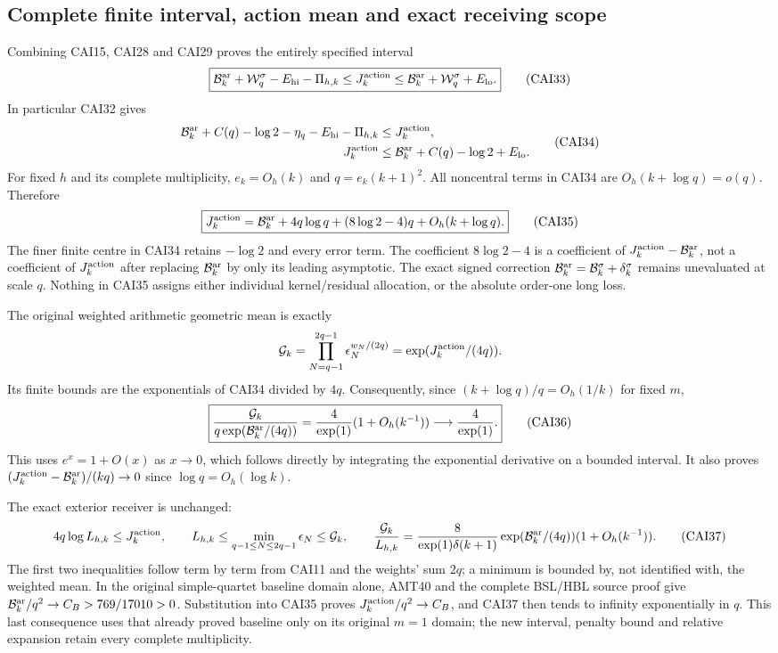 \subsection{Complete finite interval, action mean and exact receiving scope}

Combining CAI15, CAI28 and CAI29 proves the entirely specified interval
\[
 \boxed{\mathcal B_k^{\rm ar}+\mathcal W_q^\sigma-E_{\rm hi}-\Pi_{h,k}
       \le J_k^{\rm action}
       \le\mathcal B_k^{\rm ar}+\mathcal W_q^\sigma+E_{\rm lo}.}
 \tag{CAI33}
\]
In particular CAI32 gives
\[
\begin{aligned}
 \mathcal B_k^{\rm ar}+C(q)-\log2-\eta_q-E_{\rm hi}-\Pi_{h,k}
     &\le J_k^{\rm action},\\
 J_k^{\rm action}&\le\mathcal B_k^{\rm ar}+C(q)-\log2+E_{\rm lo}.
\end{aligned}\tag{CAI34}
\]
For fixed $h$ and its complete multiplicity, $e_k=O_h(k)$ and
$q=e_k(k+1)^2$. All noncentral terms in CAI34 are
$O_h(k+\log q)=o(q)$. Therefore
\[
 \boxed{J_k^{\rm action}=\mathcal B_k^{\rm ar}
     +4q\log q+(8\log2-4)q+O_h(k+\log q).}\tag{CAI35}
\]
The finer finite centre in CAI34 retains $-\log2$ and every error term.
The coefficient $8\log2-4$ is a coefficient of
$J_k^{\rm action}-\mathcal B_k^{\rm ar}$, not a coefficient of
$J_k^{\rm action}$ after replacing $\mathcal B_k^{\rm ar}$ by only its
leading asymptotic. The exact signed correction
$\mathcal B_k^{\rm ar}=\mathcal B_k^\sigma+\delta_k^\sigma$ remains
unevaluated at scale $q$. Nothing in CAI35 assigns either individual
kernel/residual allocation, or the absolute order-one long loss.

The original weighted arithmetic geometric mean is exactly
\[
 \mathcal G_k=\prod_{N=q-1}^{2q-1}\epsilon_N^{w_N/(2q)}
             =\exp(J_k^{\rm action}/(4q)).
\]
Its finite bounds are the exponentials of CAI34 divided by $4q$.
Consequently, since $(k+\log q)/q=O_h(1/k)$ for fixed $m$,
\[
 \boxed{\frac{\mathcal G_k}{q\exp(\mathcal B_k^{\rm ar}/(4q))}
          =\frac4{\exp(1)}(1+O_h(k^{-1}))\longrightarrow\frac4{\exp(1)}.}
 \tag{CAI36}
\]
This uses $e^x=1+O(x)$ as $x\to0$, which follows directly by integrating
the exponential derivative on a bounded interval. It also proves
$(J_k^{\rm action}-\mathcal B_k^{\rm ar})/(kq)\to0$ since
$\log q=O_h(\log k)$.

The exact exterior receiver is unchanged:
\[
 4q\log L_{h,k}\le J_k^{\rm action},\qquad
 L_{h,k}\le\min_{q-1\le N\le2q-1}\epsilon_N\le\mathcal G_k,
 \qquad
 \frac{\mathcal G_k}{L_{h,k}}=
 \frac8{\exp(1)\delta(k+1)}\exp(\mathcal B_k^{\rm ar}/(4q))
                              (1+O_h(k^{-1})).\tag{CAI37}
\]
The first two inequalities follow term by term from CAI11 and the
weights' sum $2q$; a minimum is bounded by, not identified with, the
weighted mean. In the original simple-quartet baseline domain alone,
AMT40 and the complete BSL/HBL source proof give
$\mathcal B_k^{\rm ar}/q^2\to C_B>769/17010>0$. Substitution into
CAI35 proves $J_k^{\rm action}/q^2\to C_B$, and CAI37 then tends to
infinity exponentially in $q$. This last consequence uses that already
proved baseline only on its original $m=1$ domain; the new interval,
penalty bound and relative expansion retain every complete multiplicity.

